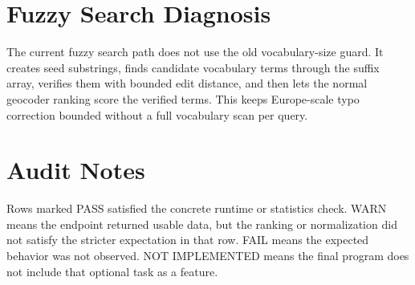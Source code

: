 \documentclass[10pt,a4paper]{article}
\begin{document}
\section*{Fuzzy Search Diagnosis}
The current fuzzy search path does not use the old vocabulary-size guard. It creates seed substrings, finds candidate vocabulary terms through the suffix array, verifies them with bounded edit distance, and then lets the normal geocoder ranking score the verified terms. This keeps Europe-scale typo correction bounded without a full vocabulary scan per query.
\section*{Audit Notes}
Rows marked PASS satisfied the concrete runtime or statistics check. WARN means the endpoint returned usable data, but the ranking or normalization did not satisfy the stricter expectation in that row. FAIL means the expected behavior was not observed. NOT IMPLEMENTED means the final program does not include that optional task as a feature.
\end{document}

